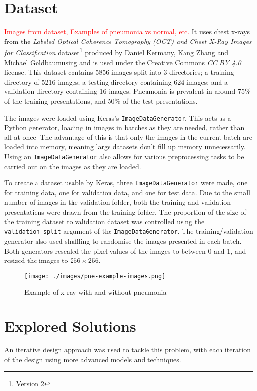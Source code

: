 \documentclass[12pt,a4paper,titlepage,twoside]{report}
\newcommand\todo[1]{\textcolor{red}{#1}}
\begin{document}
\section{Dataset}
	\todo{Images from dataset, Examples of pneumonia vs normal, etc.}
	It uses chest x-rays from the \textit{Labeled Optical Coherence Tomography (OCT) and Chest X-Ray Images for Classification} dataset\cite{pne-dataset}\footnote{Version 2} produced by Daniel Kermany, Kang Zhang and Michael Goldbaumusing and is used under the Creative Commons \textit{CC BY 4.0} license. This dataset contains 5856 images split into 3 directories; a training directory of 5216 images; a testing directory containing 624 images; and a validation directory containing 16 images. Pneumonia is prevalent in around 75\% of the training presentations, and 50\% of the test presentations. \par
	The images were loaded using Keras's \texttt{ImageDataGenerator}. This acts as a Python generator, loading in images in batches as they are needed, rather than all at once. The advantage of this is that only the images in the current batch are loaded into memory, meaning large datasets don't fill up memory unnecessarily. Using an \texttt{ImageDataGenerator} also allows for various preprocessing tasks to be carried out on the images as they are loaded. \par 
	To create a dataset usable by Keras, three \texttt{ImageDataGenerator} were made, one for training data, one for validation data, and one for test data. Due to the small number of images in the validation folder, both the training and validation presentations were drawn from the training folder. The proportion of the size of the training dataset to validation dataset was controlled using the \texttt{validation_split} argument of the \texttt{ImageDataGenerator}. The training/validation generator also used shuffling to randomise the images presented in each batch. Both generators rescaled the pixel values of the images to between 0 and 1, and resized the images to $256\times256$.
	
	\begin{figure}[h]
		\centering
		\texttt{[image: ./images/pne-example-images.png]}
		\caption{Example of x-ray with and without pneumonia}
		\label{fig:pne-example-x-rays}
	\end{figure}


\section{Explored Solutions}
	An iterative design approach was used to tackle this problem, with each iteration of the design using more advanced models and techniques.
\end{document}
